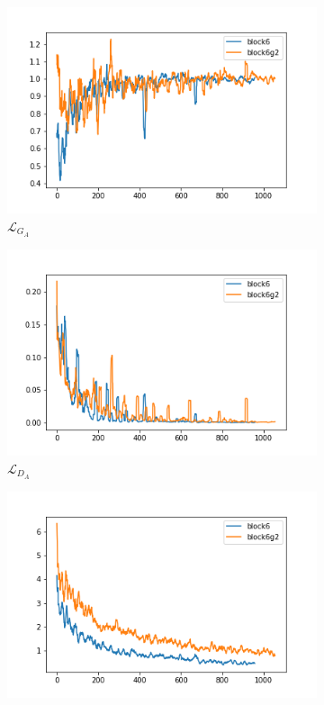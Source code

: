 \documentclass[twocolumn,11pt]{ctexart}
\begin{document}
\begin{figure}[htb]
    \centering
    \begin{subfigure}[b]{0.23\linewidth}
        \includegraphics[width=\linewidth]{exp6_G_A.png}
        \caption{$\mathcal{L}_{G_A}$}
      \end{subfigure}
      \begin{subfigure}[b]{0.23\linewidth}
        \includegraphics[width=\linewidth]{exp6_D_A.png}
        \caption{$\mathcal{L}_{D_A}$}
      \end{subfigure}
      \begin{subfigure}[b]{0.23\linewidth}
        \includegraphics[width=\linewidth]{exp6_cycle_A.png}

\end{subfigure}
\end{figure}
\end{document}
